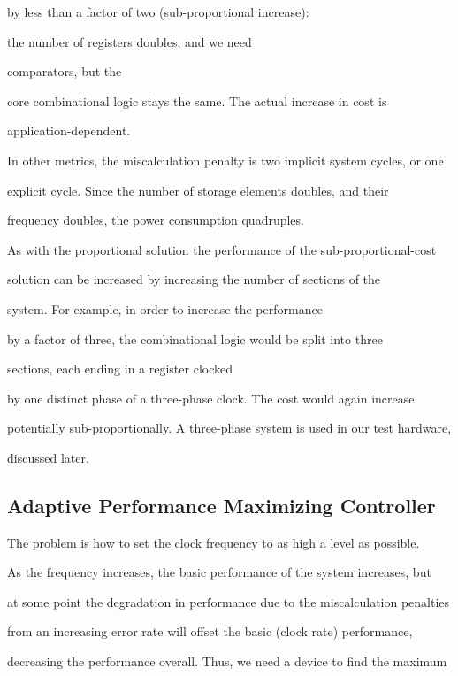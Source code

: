 \documentclass[12pt,dvips]{article}
\begin{document}
by less than a factor of two (sub-proportional increase):

the number of registers doubles, and we need

comparators, but the 

core combinational logic stays the same. The actual increase in cost is

application-dependent.



In other metrics, the miscalculation penalty is two implicit system cycles, or one

explicit cycle. Since the number of storage elements doubles, and their

frequency doubles, the power consumption quadruples.



As with the proportional solution the performance of the sub-proportional-cost

solution can be increased by increasing the number of sections of the

system. For example, in order to increase the performance

by a factor of three, the combinational logic would be split into three

sections, each ending in a register clocked

by one distinct phase of a three-phase clock. The cost would again increase

potentially sub-proportionally. A three-phase system is used in our test hardware,

discussed later.



\subsection{Adaptive Performance Maximizing Controller}

\label{adapt}

The problem is how to set the clock frequency to as high a level as possible.

As the frequency increases, the basic performance of the system increases, but

at some point the degradation in performance due to the miscalculation penalties

from an increasing error rate will offset the basic (clock rate) performance,

decreasing the performance overall. Thus, we need a device to find the maximum
\end{document}
